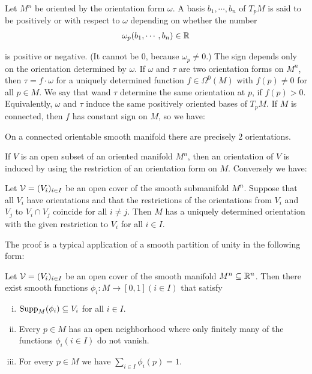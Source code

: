 Let $M^n$ be oriented by the orientation form $\omega$. A basis $b_1, \cdots, b_n$ of $T_pM$ is said
to be positively or  with respect to $\omega$ depending on whether
the number
\begin{align*}
  \omega_p(b_1 ,\cdots, b_n) \in \mathbb{R}
\end{align*}

is positive or negative. (It cannot be 0, because $\omega_p\neq 0$.) The sign depends only
on the orientation determined by $\omega$. If $\omega$ and $\tau$ are two orientation forms on $M^n$,
then $\tau=f\cdot\omega$ for a uniquely determined function $f\in\Omega^0(M)$ with $f(p)\neq 0$ for
all $p\in M$. We say that wand $\tau$ determine the same orientation at $p$, if $f(p) > 0$.
Equivalently, $\omega$ and $\tau$ induce the same positively oriented bases of $T_pM$. If $M$
is connected, then $f$ has constant sign on $M$, so we have:

\begin{lemma}\label{lemma:9-9}
  On a connected orientable smooth manifold there are precisely 2 orientations.
\end{lemma}

If $V$ is an open subset of an oriented manifold $M^n$, then an orientation of $V$ is
induced by using the restriction of an orientation form on $M$. Conversely we have:

\begin{lemma}\label{lemma:9-10}
  Let $\mathcal{V} = (V_i)_{i\in I}$ be an open cover of the smooth submanifold $M^n$.
Suppose that all $V_i$ have orientations and that the restrictions of the orientations
from $V_i$ and $V_j$ to $V_i\cap V_j$ coincide for all $i\neq j$. Then $M$ has a uniquely 
determined orientation with the given restriction to $V_i$ for all $i\in I$.
\end{lemma}

The proof is a typical application of a smooth partition of unity in the following form:


\begin{theorem}\label{theorem:9-11}
  Let $\mathcal{V} = (V_i)_{i\in I}$ be an open cover of the smooth manifold $M^n\subseteq \mathbb{R}^n$. Then 
  there exist smooth functions $\phi_i:M\to [0, 1] (i\in I)$ that satisfy
  \begin{enumerate}[(i)]
    \item $\mathrm{Supp}_M(\phi_i)\subseteq V_i$ for all $i\in I$.
    \item Every $p\in M$ has an open neighborhood where only finitely many of the
      functions $\phi_i(i\in I)$ do not vanish.
    \item For every $p\in M$ we have $\sum_{i\in I}^{}{\phi_i(p)} = 1$.
  \end{enumerate}
\end{theorem}

